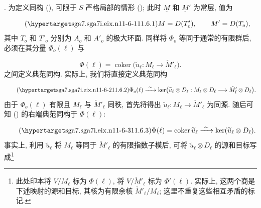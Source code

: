 
\medskip
\noindent
{}. 为定义同构 (), 可限于 $S$ 严格局部的情形 (); 此时 $\underline M$ 和 $\underline M'$ 为常层, 值为

\begin{equation}\tag{\SGARefTarget{sga7.sga7i.eix.n11-6-1}{11.6.1}}
M=D(T'_o),\qquad M'=D(T_o),
\end{equation}
其中 $T_o$ 和 $T'_o$ 分别为 $A_o$ 和 $A'_o$ 的极大环面. 同样将 $\Phi_o$ 等同于通常的有限群后, 必须在其分量 $\Phi_o(\ell)$ 与

\begin{equation*}
\Phi(\ell)=\operatorname{coker}\bigl(
 \widetilde u_\ell:M_\ell\longrightarrow\check M'_\ell\bigr).
\end{equation*}
之间定义典范同构. 实际上, 我们将直接定义典范同构

\begin{equation}\tag{\SGARefTarget{sga7.sga7i.eix.n11-6-2}{11.6.2}}
\Phi_o(\ell)\xrightarrow{\ \sim\ }
 \ker\bigl(\widetilde u_\ell\otimes D_\ell:
 M_\ell\otimes D_\ell\longrightarrow
 \check M'_\ell\otimes D_\ell\bigr).
\end{equation}
由于 $\Phi_o(\ell)$ 有限且 $M_\ell$ 与 $\check M'_\ell$ 同秩, 首先将得出 $\widetilde u_\ell:M_\ell\to\check M'_\ell$ 为同源. 随后可知 () 的右端典范同构于 $\Phi(\ell)$:

\begin{equation}\tag{\SGARefTarget{sga7.sga7i.eix.n11-6-3}{11.6.3}}
\Phi(\ell)=\operatorname{coker}\widetilde u_\ell
 \xrightarrow{\ \sim\ }
 \ker(\widetilde u_\ell\otimes D_\ell).
\end{equation}
事实上, 利用 $\widetilde u_\ell$ 将 $M_\ell$ 等同于 $\check M'_\ell$ 的有限指数子模后, 可将 $\widetilde u_\ell\otimes D_\ell$ 的源和目标写成\footnote{此处印本将 $V/M_\ell$ 标为 $\Phi(\ell)$, 将 $V/\check M'_\ell$ 标为 $\Phi'(\ell)$. 实际上, 这两个商是下述映射的源和目标, 其核为有限余核 $\check M'_\ell/M_\ell$; 这里不重复这些相互矛盾的标记.}

